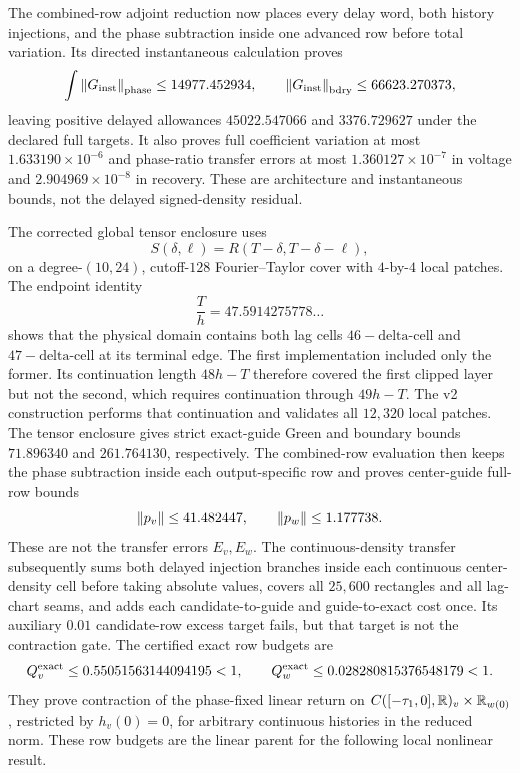 The combined-row adjoint reduction now places every delay word, both
history injections, and the phase subtraction inside one advanced row
before total variation.  Its directed instantaneous calculation proves
\[
 \int\left\lVert G_{\rm inst}\right\rVert_{\rm phase}
 \le14977.452934,\qquad
 \left\lVert G_{\rm inst}\right\rVert_{\rm bdry}\le66623.270373,
\]
leaving positive delayed allowances \(45022.547066\) and \(3376.729627\)
under the declared full targets.  It also proves full coefficient variation
at most \(1.633190\times10^{-6}\) and phase-ratio transfer errors at most
\(1.360127\times10^{-7}\) in voltage and \(2.904969\times10^{-8}\) in
recovery.  These are architecture and instantaneous bounds, not the delayed
signed-density residual.

The corrected global tensor enclosure uses
\[
 S(\delta,\ell)=R(T-\delta,T-\delta-\ell),
\]
on a degree-\((10,24)\), cutoff-\(128\) Fourier--Taylor cover with
\(4\)-by-\(4\) local patches.  The endpoint identity
\[
 \frac{T}{h}=47.5914275778\ldots
\]
shows that the physical domain contains both lag cells
\(46-\text{delta-cell}\) and \(47-\text{delta-cell}\) at its terminal edge.
The first implementation included only the former.  Its continuation length
\(48h-T\) therefore covered the first clipped layer but not the second,
which requires continuation through \(49h-T\).  The v2 construction performs
that continuation and validates all \(12{,}320\) local patches.  The tensor enclosure
gives strict exact-guide Green and boundary bounds \(71.896340\) and
\(261.764130\), respectively.  The combined-row evaluation then keeps the phase subtraction
inside each output-specific row and proves center-guide full-row bounds
\begin{equation}
 \left\lVert p_v\right\rVert\le41.482447,
 \qquad \left\lVert p_w\right\rVert\le1.177738.                         \label{eq:stage3h-row-sizes}
\end{equation}
These are not the transfer errors \(E_v,E_w\).  The continuous-density transfer subsequently sums
both delayed injection branches inside each continuous center-density cell
before taking absolute values, covers all \(25{,}600\) rectangles and all
lag-chart seams, and adds each candidate-to-guide and guide-to-exact cost
once.  Its auxiliary \(0.01\) candidate-row excess target fails, but that
target is not the contraction gate.  The certified exact row budgets are
\begin{equation}
 Q_v^{\rm exact}\le0.55051563144094195<1,
 \qquad
 Q_w^{\rm exact}\le0.028280815376548179<1.             \label{eq:stage3i-row-budgets}
\end{equation}
They prove contraction of the phase-fixed linear return on
\(C([-\tau_1,0],\mathbb R)_v\times\mathbb R_{w(0)}\), restricted by \(h_v(0)=0\), for
arbitrary continuous histories in the reduced norm.  These row budgets are
the linear parent for the following local nonlinear result.

